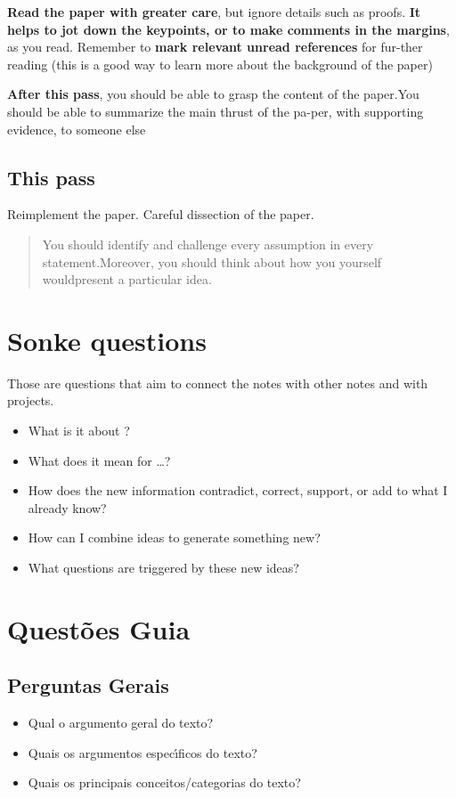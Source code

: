 \documentclass[11pt]{article}
\begin{document}
\textbf{Read the paper with greater care}, but ignore details such as proofs. \textbf{It helps to jot down the keypoints, or to make comments in the margins}, as you read.  Remember to \textbf{mark relevant unread references} for fur-ther reading (this is a good way to learn more about the background of the paper)

\textbf{After this pass}, you should be able to grasp the content of the paper.You should be able to summarize the main thrust of the pa-per, with supporting evidence, to someone else

\subsection{This pass}
\label{sec:org441267a}
Reimplement the paper. Careful dissection of the paper.

\begin{quote}
You should identify and challenge every assumption in every statement.Moreover, you should think about how you yourself wouldpresent a particular idea.
\end{quote}
\section{Sonke questions}
\label{sec:orge34860b}
Those are questions that aim to connect the notes with other notes and with
projects.

\begin{itemize}
\item What is it about ?
\item What does it mean for \ldots{}?
\item How does the new information contradict, correct, support, or add to what I already know?
\item How can I combine ideas to generate something new?
\item What questions are triggered by these new ideas?
\end{itemize}



\section{Questões Guia}
\label{sec:orgc90508d}

\subsection{Perguntas Gerais}
\label{sec:org36799e6}
\begin{itemize}
\item Qual o argumento geral do texto?
\item Quais os argumentos especı́ficos do texto?
\item Quais os principais conceitos/categorias do texto?
\end{itemize}
\end{document}
